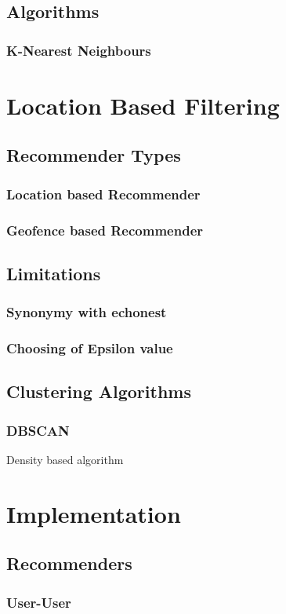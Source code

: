 \documentclass[12pt]{article}
\begin{document}
	\subsection{Algorithms}
		\subsubsection{K-Nearest Neighbours}
\pagebreak
\section{Location Based Filtering}
	\subsection{Recommender Types}
		\subsubsection{Location based Recommender}
		\subsubsection{Geofence based Recommender}
	\subsection{Limitations}
		\subsubsection{Synonymy with echonest}
		\subsubsection{Choosing of Epsilon value}
	\subsection{Clustering Algorithms}
		\subsubsection{DBSCAN}
			Density based algorithm		 
\pagebreak
\section{Implementation}
	\subsection{Recommenders}
		\subsubsection{User-User}
\end{document}
